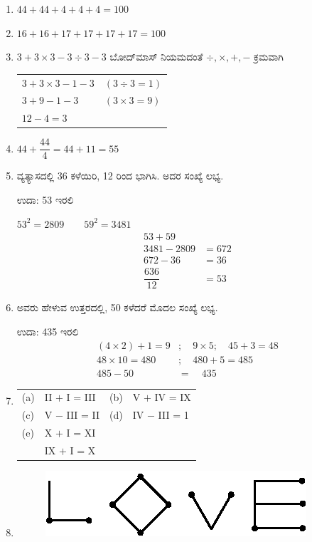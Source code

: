 \begin{enumerate}
\item $44+44+4+4+4 = 100$

\item $16+16+17+17+17+17 = 100$

\item $3+3\times 3 - 3 \div 3 - 3$ ಬೋದ್‌ಮಾಸ್ ನಿಯಮದಂತೆ $\div, \times, +, -$ ಕ್ರಮವಾಗಿ

\begin{tabular}[t]{ll}
$3+3\times 3 - 1 - 3$ & $(3 \div 3 = 1)$\\
$3+9 - 1 - 3$ & $(3 \times 3 = 9)$\\
$12 - 4 = 3$ & 
\end{tabular}

\item $44 + \dfrac{44}{4} = 44 + 11 = 55$

\item ವ್ಯತ್ಯಾಸದಲ್ಲಿ 36 ಕಳೆಯಿರಿ, 12 ರಿಂದ ಭಾಗಿಸಿ. ಅದರ ಸಂಖ್ಯೆ ಲಭ್ಯ. 

ಉದಾ: 53 ಇರಲಿ 

$53^{2} = 2809 \qquad 59^{2} = 3481$
\begin{align*}
53 + 59 & \\
3481 - 2809 & = 672\\
672 - 36 & = 36\\
\dfrac{636}{12} & = 53
\end{align*}

\item ಅವರು ಹೇಳುವ ಉತ್ತರದಲ್ಲಿ, 50 ಕಳೆದರೆ ಮೊದಲ ಸಂಖ್ಯೆ ಲಭ್ಯ. 

ಉದಾ: 435 ಇರಲಿ 
\begin{align*}
(4\times 2) + 1 = 9 & ;\quad 9\times 5; \quad 45+3 = 48\\
48\times 10 = 480 & ;\quad 480 + 5 = 485\\
485 - 50 & = \quad 435
\end{align*}

\item
\begin{tabular}[t]{llll}
(a)& II $+$ I = III & (b)& V $+$ IV = IX\\
(c)& V $-$ III = II &(d)& IV $-$ III = 1\\
(e)& X $+$ I = XI & & \\
& IX $+$ I = X & &
\end{tabular}

\item
\begin{figure}[!h]
\centering
\includegraphics{images/chap5/ans8.eps}
\end{figure}


\end{enumerate}
